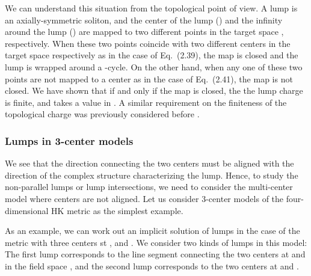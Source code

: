 \documentclass[a4paper,12pt]{article}
\begin{document}
We can understand this situation from the topological point of view. 
A lump is an axially-symmetric soliton, 
and the center of the lump (\coordHE{}) and 
the infinity around the lump (\coordHE{}) are mapped 
to two different points in the target space \coordHE{}, 
respectively.  
When these two points coincide with 
two different centers in the target space respectively as 
in the case of Eq.~(2.39), the map is closed  
and the lump is wrapped around a \coordHE{}-cycle. 
On the other hand, when any one of these two points are not mapped to 
a center as in the case of Eq.~(2.41), 
the map is not closed. 
We have shown that if and only if the map is closed, 
the the lump charge is finite, and takes a value in \coordHE{}.  
A similar requirement on the finiteness of the topological charge 
was previously considered before \cite{DLD,Abraham}. 

\subsubsection{Lumps in 3-center models}
We see that the direction connecting the two centers 
must be aligned with  the direction of the complex structure 
characterizing the lump. 
Hence, to study the non-parallel lumps or lump intersections,  
we need to consider the multi-center model 
where centers are not aligned. 
Let us consider 3-center models of the four-dimensional HK metric as 
the simplest example.

As an example, we can work out an implicit solution of  
lumps in the case of the metric with three centers st 
\coordHE{}, \coordHE{} and \coordHE{}.
We consider two kinds of lumps in this model: 
The first lump corresponds to 
the line segment connecting the two centers at 
\coordHE{} and \coordHE{} in the 
field space \coordHE{}, 
and the second lump corresponds to the two centers at 
\coordHE{} and \coordHE{}. 
\end{document}
